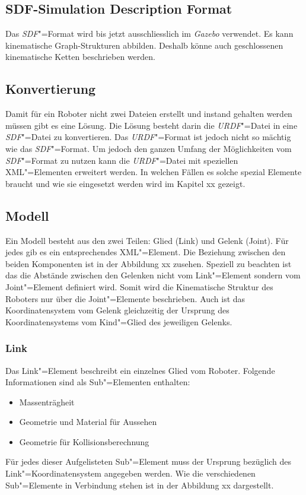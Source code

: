 \subsection{SDF-Simulation Description Format}
Das \textit{SDF}"=Format wird bis jetzt ausschliesslich im \textit{Gazebo} verwendet.
Es kann kinematische Graph-Strukturen abbilden.
Deshalb könne auch geschlossenen kinematische Ketten beschrieben werden.

\subsection{Konvertierung}
Damit für ein Roboter nicht zwei Dateien erstellt und instand gehalten werden müssen gibt es eine Lösung.
Die Lösung besteht darin die \textit{URDF}"=Datei in eine \textit{SDF}"=Datei zu konvertieren.
Das \textit{URDF}"=Format ist jedoch nicht so mächtig wie das \textit{SDF}"=Format.
Um jedoch den ganzen Umfang der Möglichkeiten vom \textit{SDF}"=Format zu nutzen kann die \textit{URDF}"=Datei mit speziellen XML"=Elementen erweitert werden.
In welchen Fällen es solche spezial Elemente braucht und wie sie eingesetzt werden wird im Kapitel xx gezeigt. %


\subsection{Modell}
Ein Modell besteht aus den zwei Teilen: Glied (Link) und Gelenk (Joint).
Für jedes gib es ein entsprechendes XML"=Element.
Die Beziehung zwischen den beiden Komponenten ist in der Abbildung xx zusehen. %
Speziell zu beachten ist das die Abstände zwischen den Gelenken nicht vom Link"=Element sondern vom Joint"=Element definiert wird.
Somit wird die Kinematische Struktur des Roboters nur über die Joint"=Elemente beschrieben.
Auch ist das Koordinatensystem vom Gelenk gleichzeitig der Ursprung des Koordinatensystems vom Kind"=Glied des jeweiligen Gelenks. 



\subsubsection*{Link}
Das Link"=Element beschreibt ein einzelnes Glied vom Roboter.
Folgende Informationen sind als Sub"=Elementen enthalten: 
\begin{itemize}
\item Massenträgheit
\item Geometrie und Material für Aussehen
\item Geometrie für Kollisionsberechnung
\end{itemize}
Für jedes dieser Aufgelisteten Sub"=Element muss der Ursprung bezüglich des Link"=Koordinatensystem angegeben werden.
Wie die verschiedenen Sub"=Elemente in Verbindung stehen ist in der Abbildung xx dargestellt. %

